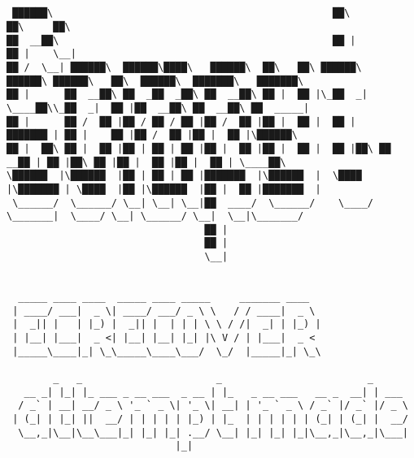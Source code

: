\documentclass[varwidth=\maxdimen,margin=0.5cm,multi={verbatim}]{standalone}
\begin{document}
\begin{verbatim}


 ██████\                                                ██\                ██\     ██\
██  __██\                                               ██ |               ██ |    \__|
██ /  \__| ██████\  ██████\████\   ██████\  ██\   ██\ ██████\    ██████\ ██████\   ██\  ██████\  ███████\   ███████\
██ |      ██  __██\ ██  _██  _██\ ██  __██\ ██ |  ██ |\_██  _|   \____██\\_██  _|  ██ |██  __██\ ██  __██\ ██  _____|
██ |      ██ /  ██ |██ / ██ / ██ |██ /  ██ |██ |  ██ |  ██ |     ███████ | ██ |    ██ |██ /  ██ |██ |  ██ |\██████\
██ |  ██\ ██ |  ██ |██ | ██ | ██ |██ |  ██ |██ |  ██ |  ██ |██\ ██  __██ | ██ |██\ ██ |██ |  ██ |██ |  ██ | \____██\
\██████  |\██████  |██ | ██ | ██ |███████  |\██████  |  \████  |\███████ | \████  |██ |\██████  |██ |  ██ |███████  |
 \______/  \______/ \__| \__| \__|██  ____/  \______/    \____/  \_______|  \____/ \__| \______/ \__|  \__|\_______/
                                  ██ |
                                  ██ |
                                  \__|


  _____ ____ ____  _____ ____ _____     _______ ____
 | ____/ ___|  _ \| ____/ ___/ _ \ \   / / ____|  _ \
 |  _|| |   | |_) |  _|| |  | | | \ \ / /|  _| | |_) |
 | |__| |___|  _ <| |__| |__| |_| |\ V / | |___|  _ <
 |_____\____|_| \_\_____\____\___/  \_/  |_____|_| \_\

        _   _                       _                         _
   __ _| |_| |_ ___ _ __ ___  _ __ | |_   _ __ ___   __ _  __| | ___
  / _` | __| __/ _ \ '_ ` _ \| '_ \| __| | '_ ` _ \ / _` |/ _` |/ _ \
 | (_| | |_| ||  __/ | | | | | |_) | |_  | | | | | | (_| | (_| |  __/
  \__,_|\__|\__\___|_| |_| |_| .__/ \__| |_| |_| |_|\__,_|\__,_|\___|
                             |_|





\end{verbatim}
\end{document}

